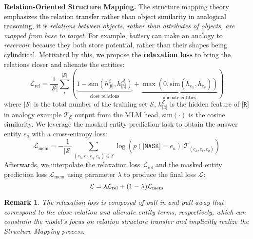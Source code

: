 \documentclass{article} \usepackage{iclr2023_conference,times}
\newtheorem{remark}{\noindent \textbf{Remark}}
\begin{document}
\textbf{Relation-Oriented Structure Mapping.}
The structure mapping theory \textcolor{black}{emphasizes the relation transfer rather than object similarity in analogical reasoning, it is} \textit{relations between objects, rather than attributes of objects, are mopped from base to target}.  For example, \textit{battery} can make an analogy to \textit{reservoir} because they both store potential, rather than their shapes being cylindrical. 
Motivated by this, we propose the \textbf{relaxation loss} to bring the relations closer and alienate the entities:
\begin{equation}
    \mathcal{L}_\text{rel} = \frac{1}{|\mathcal{S}|}
    \sum\limits_{i}^{|\mathcal{S}|}
    (
    \underbrace{1-\text{sim}(h_{\texttt{[R]}}^\mathcal{E},  h_{\texttt{[R]}}^\mathcal{A})}_{\text{close relations}}+
    \underbrace{\max{(0, \text{sim}(h_{e_h}, h_{e_q}))}}_{\text{alienate entities}}
    )
\end{equation}where $|\mathcal{S}|$ is the total number of the training set $\mathcal{S}$, $h_{\texttt{[R]}}^\mathcal{E}$ is the hidden feature of $\texttt{[R]}$ in analogy example $\mathcal{T_E}$ output from the MLM head, $\text{sim}(\cdot)$ is the cosine similarity.
We leverage the masked entity prediction task to obtain the answer entity $e_a$ with a cross-entropy loss: 
\begin{equation}
    \mathcal{L}_\text{mem} = -\frac{1}{|\mathcal{S}|} \sum\limits_{(e_h, e_t, e_q, e_a)\in \mathcal{S}}\log(p(\texttt{[MASK]}=e_a) \vert \mathcal{T}_{(e_h, e_t, e_q)})
\end{equation}
Afterwards, we interpolate the relaxation loss $\mathcal{L}_\text{rel}$ and the masked entity prediction loss $\mathcal{L}_\text{mem}$ using parameter $\lambda$ to produce the final loss $\mathcal{L}$:
\begin{equation}
\setlength{\belowdisplayskip}{0pt}
    \mathcal{L} = \lambda \mathcal{L}_\text{rel} + (1-\lambda) \mathcal{L}_\text{mem}
\end{equation}
\begin{remark}
The relaxation loss is composed of pull-in and pull-away that correspond to the close relation and alienate entity terms, respectively, which can constrain the model's focus on relation structure transfer and implicitly realize the Structure Mapping process. 
\end{remark}
\end{document}
